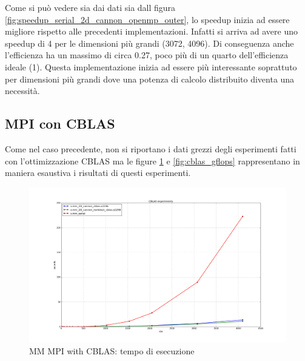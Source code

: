 Come si pu\`{o} vedere sia dai dati sia dall figura \ref{fig:speedup_serial_2d_cannon_openmp_outer}, lo speedup inizia ad essere migliore rispetto alle precedenti implementazioni. Infatti si arriva ad avere uno speedup di 4 per le dimensioni pi\`{u} grandi (3072, 4096). Di conseguenza anche l'efficienza ha un massimo di circa 0.27, poco pi\`{u} di un quarto dell'efficienza ideale (1).
Questa implementazione inizia ad essere pi\`{u} interessante soprattuto per dimensioni pi\`{u} grandi dove una potenza di calcolo distribuito diventa una necessit\`{a}.

\subsection{MPI con CBLAS}

Come nel caso precedente, non si riportano i dati grezzi degli esperimenti fatti con l'ottimizzazione CBLAS ma le figure \ref{fig:cblas_times} e \ref{fig:cblas_gflops} rappresentano in maniera esaustiva i risultati di questi esperimenti.

\begin{figure}[htbp]
    \begin{center}
        \includegraphics[width=15cm]{immagini/cblas_times.png}
    \end{center}
    \caption{MM MPI with CBLAS: tempo di esecuzione}
    \label{fig:cblas_times}
\end{figure}

